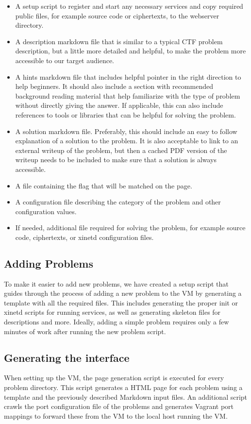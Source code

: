 \begin{itemize}
  \item A setup script to register and start any necessary services
    and copy required public files, for example source code or
    ciphertexts, to the webserver directory.
  \item A description markdown file that is similar to a typical CTF
    problem description, but a little more detailed and helpful, to
    make the problem more accessible to our target audience.
  \item A hints markdown file that includes helpful pointer in the
    right direction to help beginners. It should also include a
    section with recommended background reading material that help
    familiarize with the type of problem without directly giving the
    answer. If applicable, this can also include references to tools
    or libraries that can be helpful for solving the problem.
  \item A solution markdown file. Preferably, this should include an
    easy to follow explanation of a solution to the problem. It is
    also acceptable to link to an external writeup of the problem, but
    then a cached PDF version of the writeup needs to be included to
    make sure that a solution is always accessible.
  \item A file containing the flag that will be matched on the page.
  \item A configuration file describing the category of the problem
    and other configuration values.
  \item If needed, additional file required for solving the problem,
    for example source code, ciphertexts, or xinetd configuration
    files.
\end{itemize}

\subsection{Adding Problems}
To make it easier to add new problems, we have created a setup script
that guides through the process of adding a new problem to the VM by
generating a template with all the required files. This includes
generating the proper init or xinetd scripts for running services, as
well as generating skeleton files for descriptions and more. Ideally,
adding a simple problem requires only a few minutes of work after
running the new problem script.

\subsection{Generating the interface}
When setting up the VM, the page generation script is executed for
every problem directory. This script generates a HTML page for each
problem using a template and the previously described Markdown input
files. An additional script crawls the port configuration file of the
problems and generates Vagrant port mappings to forward these from the
VM to the local host running the VM.

